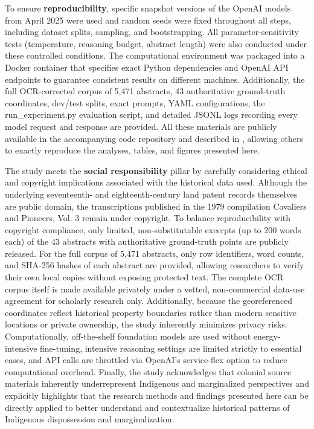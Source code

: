 To ensure \textbf{reproducibility}, specific snapshot versions of the
OpenAI models from April 2025 were used and random seeds were fixed
throughout all steps, including dataset splits, sampling, and
bootstrapping. All parameter-sensitivity tests (temperature, reasoning
budget, abstract length) were also conducted under these controlled
conditions. The computational environment was packaged into a Docker
container that specifies exact Python dependencies and OpenAI API
endpoints to guarantee consistent results on different machines.
Additionally, the full OCR-corrected corpus of 5,471 abstracts, 43
authoritative ground-truth coordinates, dev/test splits, exact prompts,
YAML configurations, the run\_experiment.py evaluation script, and
detailed JSONL logs recording every model request and response are
provided. All these materials are publicly available in the accompanying
code repository and described in \DIFdelbegin {}\DIFdelend \DIFaddbegin {}, allowing others to exactly
reproduce the analyses, tables, and figures presented here.

The study meets the \textbf{social responsibility} pillar by carefully
considering ethical and copyright implications associated with the
historical data used. Although the underlying seventeenth- and
eighteenth-century land patent records themselves are public domain, the
transcriptions published in the 1979 compilation Cavaliers and Pioneers,
Vol. 3 remain under copyright. To balance reproducibility with copyright
compliance, only limited, non-substitutable excerpts (up to 200 words
each) of the 43 abstracts with authoritative ground-truth points are
publicly released. For the full corpus of 5,471 abstracts, only row
identifiers, word counts, and SHA-256 hashes of each abstract are
provided, allowing researchers to verify their own local copies without
exposing protected text. The complete OCR corpus itself is made
available privately under a vetted, non-commercial data-use agreement
for scholarly research only. Additionally, because the georeferenced
coordinates reflect historical property boundaries rather than modern
sensitive locations or private ownership, the study inherently minimizes
privacy risks. Computationally, off-the-shelf foundation models are used
without energy-intensive fine-tuning, intensive reasoning settings are
limited strictly to essential cases, and API calls are throttled via
OpenAI's service-flex option to reduce computational overhead. Finally,
the study acknowledges that colonial source materials inherently
underrepresent Indigenous and marginalized perspectives and explicitly
highlights that the research methods and findings presented here can be
directly applied to better understand and contextualize historical
patterns of Indigenous dispossession and marginalization.

